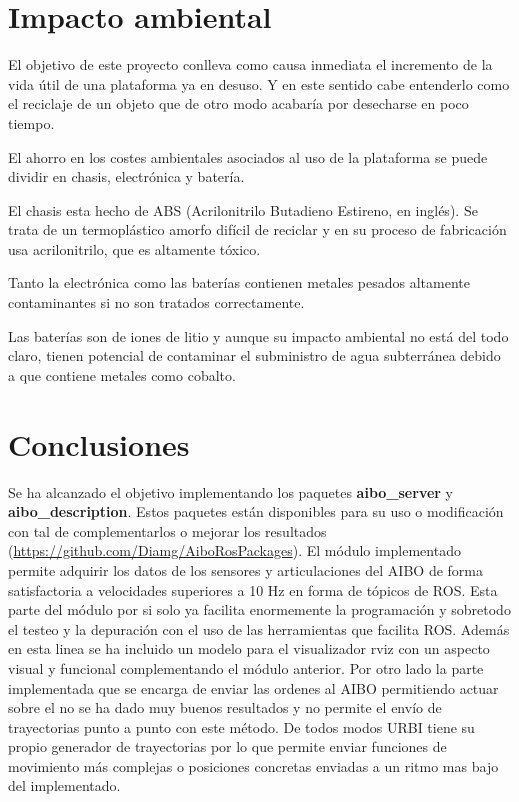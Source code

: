 \documentclass[12pt,a4paper,final,twoside]{book}
\begin{document}
\newpage

\chapter{Impacto ambiental}
\thispagestyle{fancy}
El objetivo de este proyecto conlleva como causa inmediata el incremento de la vida útil de una plataforma ya en desuso. Y en este sentido cabe entenderlo como el reciclaje de un objeto que de otro modo acabaría por desecharse en poco tiempo.

El ahorro en los costes ambientales asociados al uso de la plataforma se puede dividir en chasis, electrónica y batería.

El chasis esta hecho de ABS (Acrilonitrilo Butadieno Estireno, en inglés). Se trata de un termoplástico amorfo difícil de reciclar y en su proceso de fabricación usa acrilonitrilo, que es altamente tóxico.

Tanto la electrónica como las baterías contienen metales pesados altamente contaminantes si no son tratados correctamente.

Las baterías son de iones de litio y aunque su impacto ambiental no está del todo claro, tienen potencial de contaminar el subministro de agua subterránea debido a que contiene metales como cobalto.


\newpage
\chapter*{Conclusiones}
\thispagestyle{fancy}
Se ha alcanzado el objetivo implementando los paquetes \textbf{aibo{\_}server} y \textbf{aibo{\_}description}. Estos paquetes están disponibles para su uso o modificación con tal de complementarlos o mejorar los resultados (\url{https://github.com/Diamg/AiboRosPackages}). 
El módulo implementado permite adquirir los datos de los sensores y articulaciones del AIBO de forma satisfactoria a velocidades superiores a 10 Hz en forma de tópicos de ROS. Esta parte del módulo por si solo ya facilita enormemente la programación y sobretodo el testeo y la depuración con el uso de las herramientas que facilita ROS. Además en esta linea se ha incluido un modelo para el visualizador rviz con un aspecto visual y funcional complementando el módulo anterior.  
Por otro lado la parte implementada que se encarga de enviar las ordenes al AIBO permitiendo actuar sobre el no se ha dado muy buenos resultados y no permite el envío de trayectorias punto a punto con este método. De todos modos URBI tiene su propio generador de trayectorias por lo que permite enviar funciones de movimiento más complejas  o posiciones concretas enviadas a un ritmo mas bajo del implementado.
\end{document}
